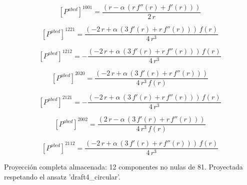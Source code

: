 \documentclass[11pt]{article}
\begin{document}
\begin{dmath*}[breakdepth={5}]
\left[P^{abcd}\right]^{1001} = \frac{\left(r - \alpha\,\left(r\,f''\!\left(r\right) + f'\!\left(r\right)\right)\right)}{2\,r}
\end{dmath*}
\par\smallskip
\begin{dmath*}[breakdepth={5}]
\left[P^{abcd}\right]^{1221} = \frac{\left(-2\,r + \alpha\,\left(3\,f'\!\left(r\right) + r\,f''\!\left(r\right)\right)\right)\,f\!\left(r\right)}{4\,{r}^{3}}
\end{dmath*}
\par\smallskip
\begin{dmath*}[breakdepth={5}]
\left[P^{abcd}\right]^{1212} = -\frac{\left(-2\,r + \alpha\,\left(3\,f'\!\left(r\right) + r\,f''\!\left(r\right)\right)\right)\,f\!\left(r\right)}{4\,{r}^{3}}
\end{dmath*}
\par\smallskip
\begin{dmath*}[breakdepth={5}]
\left[P^{abcd}\right]^{2020} = \frac{\left(-2\,r + \alpha\,\left(3\,f'\!\left(r\right) + r\,f''\!\left(r\right)\right)\right)}{4\,{r}^{3}\,f\!\left(r\right)}
\end{dmath*}
\par\smallskip
\begin{dmath*}[breakdepth={5}]
\left[P^{abcd}\right]^{2121} = -\frac{\left(-2\,r + \alpha\,\left(3\,f'\!\left(r\right) + r\,f''\!\left(r\right)\right)\right)\,f\!\left(r\right)}{4\,{r}^{3}}
\end{dmath*}
\par\smallskip
\begin{dmath*}[breakdepth={5}]
\left[P^{abcd}\right]^{2002} = \frac{\left(2\,r - \alpha\,\left(3\,f'\!\left(r\right) + r\,f''\!\left(r\right)\right)\right)}{4\,{r}^{3}\,f\!\left(r\right)}
\end{dmath*}
\par\smallskip
\begin{dmath*}[breakdepth={5}]
\left[P^{abcd}\right]^{2112} = \frac{\left(-2\,r + \alpha\,\left(3\,f'\!\left(r\right) + r\,f''\!\left(r\right)\right)\right)\,f\!\left(r\right)}{4\,{r}^{3}}
\end{dmath*}
\par\smallskip
Proyección completa almacenada: 12 componentes no nulas de 81. Proyectada respetando el ansatz 'draft4\_circular'.\par\medskip
{}
\end{document}
